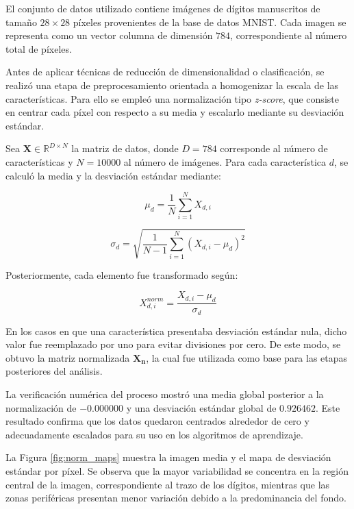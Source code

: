 \documentclass[11pt, a4paper]{article}
\begin{document}
El conjunto de datos utilizado contiene imágenes de dígitos manuscritos de tamaño $28 \times 28$ píxeles provenientes de la base de datos MNIST. Cada imagen se representa como un vector columna de dimensión $784$, correspondiente al número total de píxeles.

Antes de aplicar técnicas de reducción de dimensionalidad o clasificación, se realizó una etapa de preprocesamiento orientada a homogenizar la escala de las características. Para ello se empleó una normalización tipo \textit{z-score}, que consiste en centrar cada píxel con respecto a su media y escalarlo mediante su desviación estándar.

Sea $\mathbf{X} \in \mathbb{R}^{D \times N}$ la matriz de datos, donde $D = 784$ corresponde al número de características y $N = 10000$ al número de imágenes. Para cada característica $d$, se calculó la media y la desviación estándar mediante:

\begin{equation}
\mu_d = \frac{1}{N}\sum_{i=1}^{N} X_{d,i}
\end{equation}

\begin{equation}
\sigma_d = \sqrt{\frac{1}{N-1}\sum_{i=1}^{N} (X_{d,i}-\mu_d)^2}
\end{equation}

Posteriormente, cada elemento fue transformado según:

\begin{equation}
X^{norm}_{d,i} = \frac{X_{d,i} - \mu_d}{\sigma_d}
\end{equation}

En los casos en que una característica presentaba desviación estándar nula, dicho valor fue reemplazado por uno para evitar divisiones por cero. De este modo, se obtuvo la matriz normalizada $\mathbf{X_n}$, la cual fue utilizada como base para las etapas posteriores del análisis.

La verificación numérica del proceso mostró una media global posterior a la normalización de $-0.000000$ y una desviación estándar global de $0.926462$. Este resultado confirma que los datos quedaron centrados alrededor de cero y adecuadamente escalados para su uso en los algoritmos de aprendizaje.

La Figura \ref{fig:norm_maps} muestra la imagen media y el mapa de desviación estándar por píxel. Se observa que la mayor variabilidad se concentra en la región central de la imagen, correspondiente al trazo de los dígitos, mientras que las zonas periféricas presentan menor variación debido a la predominancia del fondo.
\end{document}

